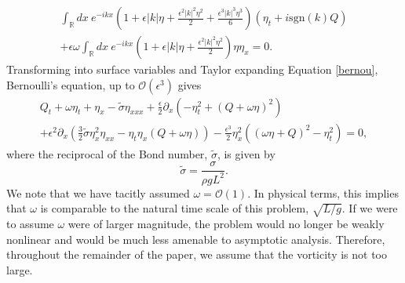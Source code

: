 \documentclass[a4paper,11pt]{article}
\newcommand{\pd}{\partial}
\begin{document}
\begin{multline}
\int_{\mathbb{R}}dx~e^{-ikx}\left(1 + \epsilon |k|\eta + \frac{\epsilon^{2}|k|^{2}\eta^{2}}{2} + \frac{\epsilon^{3}|k|^{3}\eta^{3}}{6}\right)\left(\eta_{t} + i \mbox{sgn}(k)Q \right) \\
+ \epsilon \omega \int_{\mathbb{R}}dx~e^{-ikx}\left(1 + \epsilon |k|\eta + \frac{\epsilon^{2}|k|^{2}\eta^{2}}{2}\right) \eta \eta_{x} = 0.
\label{integro1}
\end{multline}
Transforming into surface variables and Taylor expanding Equation \eqref{bernou}, Bernoulli's equation, up to $\mathcal{O}(\epsilon^3)$ gives
\begin{multline}
Q_{t} + \omega \eta_{t} + \eta_{x} - \tilde{\sigma}\eta_{xxx} + \frac{\epsilon}{2}\pd_{x}\left(-\eta_{t}^{2} + (Q+\omega \eta)^{2} \right)\\
+ \epsilon^{2}\pd_{x}\left( \frac{3}{2}\tilde{\sigma}\eta_{x}^{2}\eta_{xx} - \eta_{t}\eta_{x} \left(Q  + \omega \eta \right) \right) - \frac{\epsilon^{3}}{2}\eta_{x}^{2}\left((\omega\eta+Q)^{2}-\eta_{t}^{2}\right) = 0,
\label{berexp}
\end{multline}
where the reciprocal of the Bond number, $\tilde{\sigma}$, is given by
\[
\tilde{\sigma} = \frac{\sigma}{\rho g L^2}.
\]
We note that we have tacitly assumed $\omega = \mathcal{O}(1)$.  In physical terms, this implies that $\omega$ is comparable to the natural time scale of this problem, $\sqrt{L/g}$.  If we were to assume $\omega$ were of larger magnitude, the problem would no longer be weakly nonlinear and would be much less amenable to asymptotic analysis.  Therefore, throughout the remainder of the paper, we assume that the vorticity is not too large.

\end{document}

